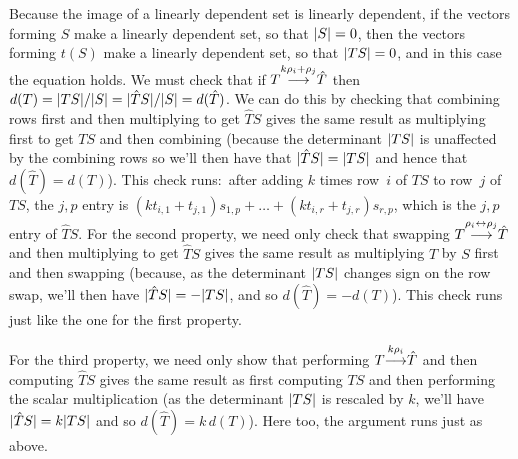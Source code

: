 \begin{exercises}
    \begin{answer}
      \begin{exparts}
        \partsitem Because the image of a linearly dependent set is 
          linearly dependent,
          if the vectors forming $S$ make a linearly dependent set, 
          so that $\deter{S}=0$,
          then the vectors forming $t(S)$ make a linearly dependent set,
          so that $\deter{TS}=0$, and in this case the equation holds.
        \partsitem We must check that if
          $T\smash[b]{\mathrel{ \mathop{\longrightarrow}\limits^{k\rho_i+\rho_j\mathstrut}_{ \begin{subarray}{l} \relax \end{subarray}}}}\hat{T}$ then 
          $d(T)=\deter{TS}/\deter{S}=\deter{\hat{T}S}/\deter{S}=d(\hat{T})$.
          We can do this by checking that combining rows first and
          then multiplying to get \( \hat{T}S \) gives the same result as
          multiplying first to get \( TS \) and then combining
          (because the determinant \( \deter{TS} \) is unaffected by the
          combining rows 
          so we'll then have that \( \deter{\hat{T}S}=\deter{TS} \) and
          hence that \( d(\hat{T})=d(T) \)).
          This check runs:~after adding 
          \( k \) times row~\( i \) of \( TS \) to
          row~$j$ of \( TS \), the \( j,p \) entry is
          \( (kt_{i,1}+t_{j,1})s_{1,p}+\dots+(kt_{i,r}+t_{j,r})s_{r,p} \),
          which is the \( j,p \) entry of \( \hat{T}S \).
        \partsitem For the second property, we need only check that swapping
          $T\smash[b]{\mathrel{ \mathop{\longrightarrow}\limits^{\rho_i\leftrightarrow\rho_j\mathstrut}_{ \begin{subarray}{l} \relax \end{subarray}}}}\hat{T}$
          and then multiplying to get \( \hat{T}S \) gives the same result as
          multiplying \( T \) by \( S \) first and then swapping 
          (because,
          as the determinant \( \deter{TS} \) changes sign on
          the row swap, we'll then have \( \deter{\hat{T}S}=-\deter{TS} \),
          and so \( d(\hat{T})=-d(T) \)). 
          This check runs just like the one for the first property.

          For the third property, we need only show that performing
          $T\smash[b]{\mathrel{ \mathop{\longrightarrow}\limits^{k\rho_i\mathstrut}_{ \begin{subarray}{l} \relax \end{subarray}}}}\hat{T}$ 
          and then computing \( \hat{T}S \) gives the same result as
          first computing \( TS \) and then performing the scalar 
          multiplication
          (as the determinant \( \deter{TS} \) is rescaled by \( k \), 
          we'll have \( \deter{\hat{T}S}=k\deter{TS} \) and
          so \( d(\hat{T})=k\,d(T) \)).
          Here too, the argument runs just as above.


\end{exparts}
\end{answer}
\end{exercises}
